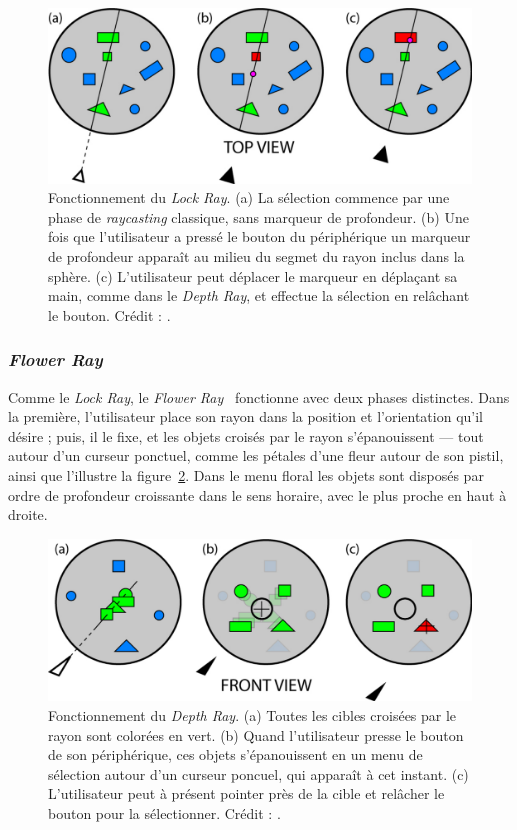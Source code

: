 	\begin{figure}[!htb]
		\centering
		\includegraphics[width=\rayWidth]{figures/ch2/lockRay}
		\caption[Principe du \emph{Lock Ray}]{Fonctionnement du \emph{Lock Ray}. (a) La sélection commence par une phase de \emph{raycasting} classique, sans marqueur de profondeur. (b) Une fois que l'utilisateur a pressé le bouton du périphérique un marqueur de profondeur apparaît au milieu du segmet du rayon inclus dans la sphère. (c) L'utilisateur peut déplacer le marqueur en déplaçant sa main, comme dans le \emph{Depth Ray}, et effectue la sélection en relâchant le bouton. Crédit : \cite{grossman2006design}.}
		\label{fig:lockRay}
	\end{figure}
	
	\subsubsection{\emph{Flower Ray}}
	Comme le \emph{Lock Ray}, le \emph{Flower Ray}~\cite{grossman2006design} fonctionne avec deux phases distinctes. Dans la première, l'utilisateur place son rayon dans la position et l'orientation qu'il désire ; puis, il le fixe, et les objets croisés par le rayon \og s'épanouissent \fg{}  --- tout autour d'un curseur ponctuel, comme les pétales d'une fleur autour de son pistil, ainsi que l'illustre la figure~\ref{fig:flowerRay}. Dans le menu \og floral \fg{} les objets sont disposés par ordre de profondeur croissante dans le sens horaire, avec le plus proche en haut à droite.
	
	\begin{figure}[!htb]
		\centering
		\includegraphics[width=\rayWidth]{figures/ch2/flowerRay}
		\caption[Principe du \emph{Flower Ray}]{Fonctionnement du \emph{Depth Ray}. (a) Toutes les cibles croisées par le rayon sont colorées en vert. (b) Quand l'utilisateur presse le bouton de son périphérique, ces objets s'épanouissent en un menu de sélection autour d'un curseur poncuel, qui apparaît à cet instant. (c) L'utilisateur peut à présent pointer près de la cible et relâcher le bouton pour la sélectionner. Crédit : \cite{grossman2006design}.}
		\label{fig:flowerRay}
	\end{figure}
	
